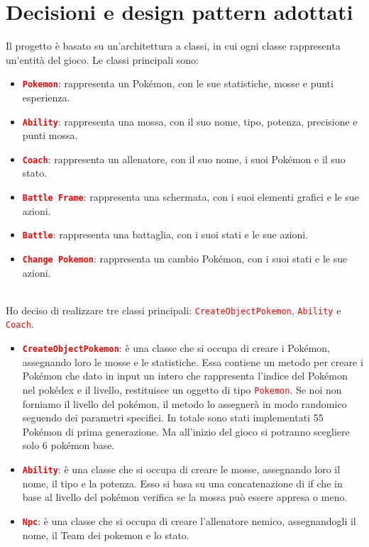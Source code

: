 \documentclass[12pt]{article}
\begin{document}
\newpage
\section{Decisioni e design pattern adottati}
Il progetto è basato su un'architettura a classi, in cui ogni classe rappresenta un'entità del gioco. Le classi principali sono:
\begin{itemize}
    \item \textbf{\texttt{\textcolor{red}{Pokemon}}}: rappresenta un Pokémon, con le sue statistiche, mosse e punti esperienza.
    \item \textbf{\texttt{\textcolor{red}{Ability}}}: rappresenta una mossa, con il suo nome, tipo, potenza, precisione e punti mossa.
    \item \textbf{\texttt{\textcolor{red}{Coach}}}: rappresenta un allenatore, con il suo nome, i suoi Pokémon e il suo stato.
    \item \textbf{\texttt{\textcolor{red}{Battle Frame}}}: rappresenta una schermata, con i suoi elementi grafici e le sue azioni.
    \item \textbf{\texttt{\textcolor{red}{Battle}}}: rappresenta una battaglia, con i suoi stati e le sue azioni.
    \item \textbf{\texttt{\textcolor{red}{Change Pokemon}}}: rappresenta un cambio Pokémon, con i suoi stati e le sue azioni.
\end{itemize}
\par\medskip\noindent \\
Ho deciso di realizzare tre classi principali: \texttt{\textcolor{red}{CreateObjectPokemon}}, \texttt{\textcolor{red}{Ability}} e \texttt{\textcolor{red}{Coach}}.
\begin{itemize}
    \item \textbf{\texttt{\textcolor{red}{CreateObjectPokemon}}}: è una classe che si occupa di creare i Pokémon, assegnando loro le mosse e le statistiche. Essa contiene un metodo per creare i Pokémon che dato in input
    un intero che rappresenta l'indice del Pokémon nel pokédex e il livello, restituisce un oggetto di tipo \texttt{\textcolor{red}{Pokemon}}. Se noi non forniamo il livello del pokémon, il metodo lo assegnerà in modo randomico
    seguendo dei parametri specifici. In totale sono stati implementati 55 Pokémon di prima generazione. Ma all'inizio del gioco si potranno scegliere solo 6 pokémon base.
    \item \textbf{\texttt{\textcolor{red}{Ability}}}: è una classe che si occupa di creare le mosse, assegnando loro il nome, il tipo e la potenza. Esso si basa su una concatenazione di if che in base al livello del pokémon verifica se la mossa può essere appresa o meno.
    \item \textbf{\texttt{\textcolor{red}{Npc}}}: è una classe che si occupa di creare l'allenatore nemico, assegnandogli il nome, il Team dei pokemon e lo stato.
\end{itemize}
\end{document}
